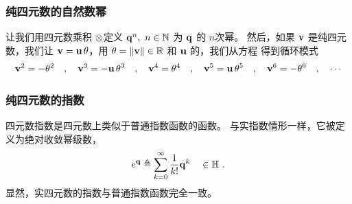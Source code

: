 \subsubsection{纯四元数的自然数幂}

让我们用四元数乘积 $\otimes$定义 ${\bf q}^n, ~n\in{\mathbb N}$ 为 ${\bf q}$ 的 $n$次幂。
然后，如果 ${\bf v}$ 是纯四元数，我们让 ${\bf v}={\bf u}\,\theta$，用 $\theta={\left\|{\bf v}\right\|}\in{\mathbb R}$ 和 ${\bf u}$ 的，我们从方程  得到循环模式
%
\begin{align}
{\bf v}^2 = -\theta^2 \quad,\quad
{\bf v}^3 = -{\bf u}\,\theta^3 \quad,\quad
{\bf v}^4 = \theta^4 \quad,\quad
{\bf v}^5 = {\bf u}\,\theta^5 \quad,\quad
{\bf v}^6 = -\theta^6 \quad,\quad
\cdots
\label{equ:qvPowers}
\end{align}
%




\subsubsection{纯四元数的指数}

四元数指数是四元数上类似于普通指数函数的函数。 
与实指数情形一样，它被定义为绝对收敛幂级数，
%
\begin{align}
e^{\bf q}
\triangleq \sum_{k=0}^\infty \frac{1}{k!}{\bf q}^k \quad \in {\mathbb H}
~.
\label{equ:quatExpSeries}
\end{align}
%
显然，实四元数的指数与普通指数函数完全一致。 

